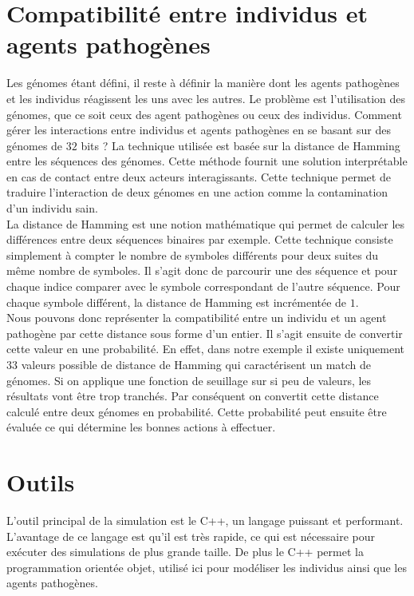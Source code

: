 \section{Compatibilité entre individus et agents pathogènes}
Les génomes étant défini, il reste à définir la manière dont les agents pathogènes et les individus réagissent les uns avec les autres. Le problème est l'utilisation des génomes, que ce soit ceux des agent pathogènes ou ceux des individus. Comment gérer les interactions entre individus et agents pathogènes en se basant sur des génomes de $32$ bits ? La technique utilisée est basée sur la distance de Hamming entre les séquences des génomes. Cette méthode fournit une solution interprétable en cas de contact entre deux acteurs interagissants. Cette technique permet de traduire l'interaction de deux génomes en une action comme la contamination d'un individu sain.\\

La distance de Hamming est une notion mathématique qui permet de calculer les différences entre deux séquences binaires par exemple. Cette technique consiste simplement à compter le nombre de symboles différents pour deux suites du même nombre de symboles. Il s'agit donc de parcourir une des séquence et pour chaque indice comparer avec le symbole correspondant de l'autre séquence. Pour chaque symbole différent, la distance de Hamming est incrémentée de $1$.\\

Nous pouvons donc représenter la compatibilité entre un individu et un agent pathogène par cette distance sous forme d'un entier. Il s'agit ensuite de convertir cette valeur en une probabilité. En effet, dans notre exemple il existe uniquement $33$ valeurs possible de distance de Hamming qui caractérisent un match de génomes. Si on applique une fonction de seuillage sur si peu de valeurs, les résultats vont être trop tranchés. Par conséquent on convertit cette distance calculé entre deux génomes en probabilité. Cette probabilité peut ensuite être évaluée ce qui détermine les bonnes actions à effectuer.\\

\section{Outils}
L'outil principal de la simulation est le C++, un langage puissant et performant. L'avantage de ce langage est qu'il est très rapide, ce qui est nécessaire pour exécuter des simulations de plus grande taille. De plus le C++ permet la programmation orientée objet, utilisé ici pour modéliser les individus ainsi que les agents pathogènes.\\

